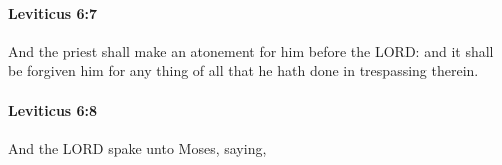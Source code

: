 		\paragraph{Leviticus 6:7} %
			\label{LEVITICUS-6-7}

			And the priest shall make an atonement for him before the LORD: and it shall be forgiven him for any thing of all that he hath done in trespassing therein.


		\paragraph{Leviticus 6:8} %
			\label{LEVITICUS-6-8}

			And the LORD spake unto Moses, saying,


